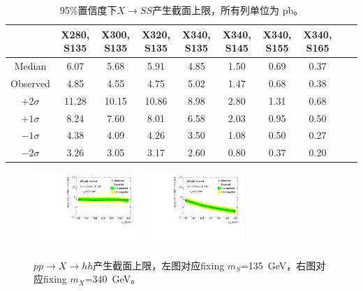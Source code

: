 \begin{table}[h]
\scriptsize
\begin{center}
\begin{tabular}{cccccccccc}
\hline
\hline
& X280, S135 &X300, S135 &X320, S135 &X340, S135 &X340, S145  &X340, S155 &X340, S165 \\
\hline
Median &6.07 &5.68 &5.91 &4.85 &1.50 &0.69 &0.37 \\
Observed &4.85 &4.55 &4.75 &5.02 &1.47 &0.68 &0.38 \\
\hline
$+2\sigma$ &11.28 &10.15 &10.86 &8.98 &2.80 &1.31 &0.68 \\
$+1\sigma$ &8.24 &7.60 &8.01 &6.58 &2.03 &0.95 &0.50 \\
$-1\sigma$ &4.38 &4.09 &4.26 &3.50 &1.08 &0.50 &0.27 \\
$-2\sigma$ &3.26 &3.05 &3.17 &2.60 &0.80 &0.37 &0.20 \\
\hline
\hline
\end{tabular}
\caption{95\%置信度下$X\rightarrow SS$产生截面上限，所有列单位为 pb。}
\label{tab:limits_HSS_combined}
\end{center}
\end{table}
\begin{figure}[!h!tpb]
  \centering
  \includegraphics[width=0.35\textwidth, angle=-90]{fig/Statistical/limit_HSS_S135_AllSys.pdf}
  \includegraphics[width=0.35\textwidth, angle=-90]{fig/Statistical/limit_HSS_H340_AllSys.pdf}
  \caption{$pp\rightarrow X \rightarrow hh$产生截面上限，左图对应fixing $m_S$=135~GeV，右图对应fixing $m_X$=340~GeV。}
\label{fig:limit_HSS}
\end{figure}
